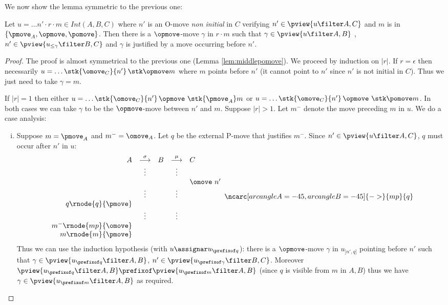 We now show the lemma symmetric to the previous one:
\begin{lemma}
\label{lem:middleopmove}
Let $u = \ldots n' \cdot r \cdot m \in Int(A,B,C)$ where
$n'$ is an O-move \emph{non initial} in $C$ verifying $n' \in \pview{u\filter A,C}$ and $m$ is in $\{\pmove_A, \opmove, \pomove\}$. Then there is a $\opmove$-move $\gamma$ in $r \cdot m$ such that $\gamma \in \pview{u\filter A,B}$ , $n' \in \pview{u_{\leq \gamma} \filter B,C}$ and $\gamma$ is justified by a move occurring before $n'$.
\end{lemma}
\begin{proof}
The proof is almost symmetrical to the previous one (Lemma \ref{lem:middlepomove}). We proceed by induction on $|r|$.
If $r=\epsilon$ then necessarily $u = \ldots \stk {\omove_C} {n'} \thinspace\stk \opmove m$ where $m$ points before $n'$ (it cannot point to $n'$
since $n'$ is not initial in $C$). Thus we just need to take $\gamma = m$.

If $|r|=1$ then either
$u = \ldots \stk {\omove_C} {n'} \thinspace\opmove\thinspace\thinspace\stk{\pmove_A} m$
or $u = \ldots \stk {\omove_C} {n'} \thinspace\opmove\thinspace\thinspace\stk \pomove m$.
In both cases we can take $\gamma$ to be the $\opmove$-move between $n'$ and $m$.
Suppose $|r|>1$. Let $m^-$ denote the move preceding $m$ in $u$.
We do a case analysis:
\begin{enumerate}[i.]
\item Suppose $m = \pmove_A$ and $m^- = \omove_A$.
Let $q$ be the external P-move that justifies $m^-$.
Since $n' \in \pview{u\filter A,C}$, $q$ must occur after $n'$ in $u$:
$$
\begin{array}{rcccl}
A & \stackrel\sigma{\longrightarrow} & B & \stackrel\mu{\longrightarrow} & C \\
&\vdots&&\vdots\\
&&&& \omove\ n'\\
&\vdots&&\vdots  \\
q\rnode{q}{\pmove}  \\
&\vdots&&\vdots  \\
m^- \rnode{mp}{\omove}  \\
m \rnode{m}{\pmove}  \\
\end{array}
\ncarc[arcangleA=-45,arcangleB=-45]{->}{mp}{q}
 $$
Thus we can use the induction hypothesis (with $u\assignar u_{\prefixof q}$): there is a $\opmove$-move $\gamma$
in $u_{]n',q]}$ pointing before $n'$ such that $\gamma \in \pview{u_{\prefixof q} \filter A,B}$, $n' \in \pview{u_{\prefixof \gamma} \filter B,C}$.
Moreover $\pview{u_{\prefixof q} \filter A,B} \prefixof \pview{u_{\prefixof m} \filter A,B}$ (since $q$ is visible from $m$ in $A,B$) thus we have $\gamma \in \pview{u_{\prefixof m} \filter A,B}$ as required.


\end{enumerate}
\end{proof}
